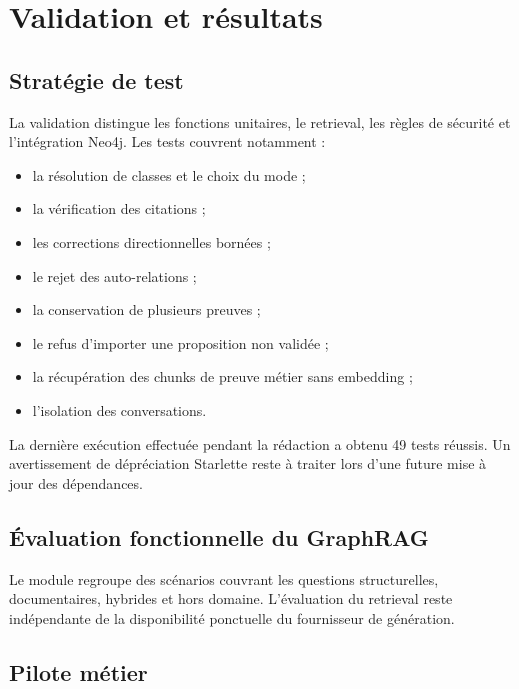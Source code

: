 \chapter{Validation et résultats}

\section{Stratégie de test}

La validation distingue les fonctions unitaires, le retrieval, les règles de sécurité et l'intégration Neo4j. Les tests couvrent notamment :

\begin{itemize}
  \item la résolution de classes et le choix du mode ;
  \item la vérification des citations ;
  \item les corrections directionnelles bornées ;
  \item le rejet des auto-relations ;
  \item la conservation de plusieurs preuves ;
  \item le refus d'importer une proposition non validée ;
  \item la récupération des chunks de preuve métier sans embedding ;
  \item l'isolation des conversations.
\end{itemize}

La dernière exécution effectuée pendant la rédaction a obtenu 49 tests réussis. Un avertissement de dépréciation Starlette reste à traiter lors d'une future mise à jour des dépendances.


\section{Évaluation fonctionnelle du GraphRAG}

Le module  regroupe des scénarios couvrant les questions structurelles, documentaires, hybrides et hors domaine. L'évaluation du retrieval reste indépendante de la disponibilité ponctuelle du fournisseur de génération.

\section{Pilote métier}

